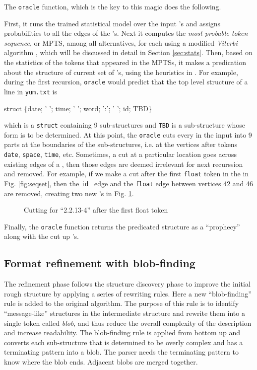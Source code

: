 The {\tt oracle} function, which is the key to this magic does the
following. 

First, it runs the trained statistical model over the 
input \seqset's and assigns probabilities to all the edges of the \seqset's.
Next it computes the {\em most probable token sequence}, or MPTS, among all alternatives,
for each \seqset{} using a modified {\em Viterbi} algorithm \cite{rabiner89:hmm},
which will be discussed in detail in Section \ref{sec:stats}.
Then, based on the statistics of the tokens that appeared in the MPTSs,
it makes a predication about the structure of current set of
\seqset's, using the heuristics in \cite{fisher+:dirttoshovels}.
For example, during the first recursion, 
{\tt oracle} would predict that the top level structure of
a line in {\tt yum.txt} is 

\begin{centercode}
struct \{date;  ' '; time; ' '; word; ':'; ' '; id; TBD\}
\end{centercode}
which is a {\tt struct} containing 9 sub-structures and {\tt TBD} is a sub-structure
whose form is to be determined. At this point, the {\tt oracle} cuts
every \seqset{} in the input into 9 parts at the boundaries of the sub-structures,
i.e. at the vertices after tokens {\tt date}, {\tt space}, {\tt time}, etc. 
Sometimes, a cut at a particular location goes across existing edges of a
\seqset, then those edges are deemed irrelevant for next recurssion and removed.
For example, if we make a cut after the first {\tt float} token in the \seqset{}
in Fig. \ref{fig:seqset}, then the {\tt id}~ edge and the {\tt float} edge between
vertices 42 and 46 are removed, creating two new \seqset's in Fig. \ref{fig:cut}.

\begin{figure}[th]
\begin{center}
\end{center}
\caption{Cutting \seqset{} for ``2.2.13-4'' after the first float token} \label{fig:cut}
\end{figure}

Finally, the {\tt oracle} function returns the predicated structure as a ``prophecy''
along with the cut up \seqset's. 

\subsection{Format refinement with blob-finding}
The refinement phase follows the structure discovery phase to
improve the initial rough structure by applying a series of
rewriting rules. Here a new ``blob-finding'' rule is added to
the original algorithm. The purpose of this rule is to identify
``message-like'' structures in the intermediate structure and rewrite them into
a single token called {\em blob}, and thus reduce the overall complexity
of the description and increase readability. The blob-finding rule is applied
from bottom up and converts each sub-structure that is
determined to be overly complex and has a terminating pattern into a
blob. The \pads{} parser needs the terminating pattern to
know where the blob ends. Adjacent blobs are merged together. 

